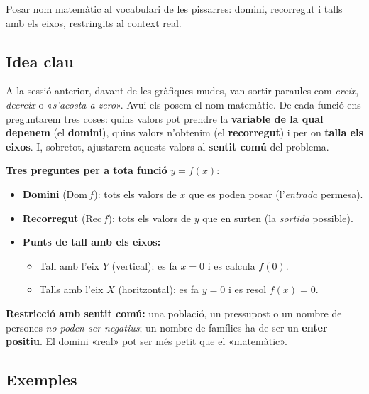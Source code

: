 %
{Posar nom matemàtic al vocabulari de les pissarres: domini, recorregut i talls amb els eixos, restringits al context real.}

\subsection{Idea clau}

A la sessió anterior, davant de les gràfiques mudes, van sortir paraules com
\emph{creix}, \emph{decreix} o «\emph{s'acosta a zero}». Avui els posem el nom
matemàtic. De cada funció ens preguntarem tres coses: quins valors pot prendre la
\textbf{variable de la qual depenem} (el \textbf{domini}), quins valors n'obtenim
(el \textbf{recorregut}) i per on \textbf{talla els eixos}. I, sobretot, ajustarem
aquests valors al \textbf{sentit comú} del problema.

\begin{idea}
\textbf{Tres preguntes per a tota funció} $y=f(x)$:
\begin{itemize}[leftmargin=1.4em, itemsep=2pt]
  \item \textbf{Domini} ($\mathrm{Dom}\,f$): tots els valors de $x$ que es poden
        posar (l'\emph{entrada} permesa).
  \item \textbf{Recorregut} ($\mathrm{Rec}\,f$): tots els valors de $y$ que en
        surten (la \emph{sortida} possible).
  \item \textbf{Punts de tall amb els eixos:}
        \begin{itemize}[leftmargin=1.2em, itemsep=1pt]
          \item Tall amb l'eix $Y$ (vertical): es fa $x=0$ i es calcula $f(0)$.
          \item Talls amb l'eix $X$ (horitzontal): es fa $y=0$ i es resol $f(x)=0$.
        \end{itemize}
\end{itemize}
\textbf{Restricció amb sentit comú:} una població, un pressupost o un nombre de
persones \emph{no poden ser negatius}; un nombre de famílies ha de ser un
\textbf{enter positiu}. El domini «real» pot ser més petit que el «matemàtic».
\end{idea}

\subsection{Exemples}

